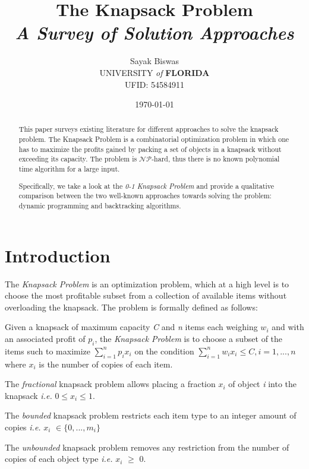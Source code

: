 \documentclass{article}
\title{The Knapsack Problem \\ \small \textit{A Survey of Solution Approaches}}
\date{\small \today}
\author{Sayak Biswas \\ \small UNIVERSITY \textit{of} \textbf{FLORIDA} \\ \small UFID: 54584911}
\begin{document}
\maketitle
\begin{abstract}
This paper surveys existing literature for different approaches to solve the knapsack problem. The Knapsack Problem is a combinatorial optimization problem in which one has to maximize the profits gained by packing a set of objects in a knapsack without exceeding its capacity. The problem is $\mathcal{NP}$-hard, thus there is no known polynomial time algorithm for a large input.

Specifically, we take a look at the \textit{0-1 Knapsack Problem} and provide a qualitative comparison between the two well-known approaches towards solving the problem: dynamic programming and backtracking algorithms.
\end{abstract}
\newpage


\section{Introduction}
The \textit{Knapsack Problem} is an optimization problem, which at a high level is to choose the most profitable subset from a collection of available items without overloading the knapsack. The problem is formally defined as follows:

Given a knapsack of maximum capacity \textit{C} and \textit{n} items each weighing \textit{$w_{i}$} and with an associated profit of \textit{$p_{i}$}, the \textit{Knapsack Problem} is to choose a subset of the items such to maximize $\sum_{i=1}^{n}\textit{$p_{i}x_{i}$}$ on the condition $\sum_{i=1}^{n}\textit{$w_{i}x_{i}$} \leq \textit{C}, \textit{i} = 1,...,\textit{n}$ where \textit{$x_{i}$} is the number of copies of each item.

The \textit{fractional} knapsack problem allows placing a fraction \textit{$x_{i}$} of object \textit{i} into the knapsack \textit{i.e.} $0 \le \textit{$x_{i}$} \le 1$.

The \textit{bounded} knapsack problem restricts each item type to an integer amount of copies \textit{i.e.} \textit{$x_{i}$} $\in \{0,...,m_{i}\}$

The \textit{unbounded} knapsack problem removes any restriction from the number of copies of each object type \textit{i.e.} \textit{$x_{i}$} $\ge$ 0.
\end{document}
